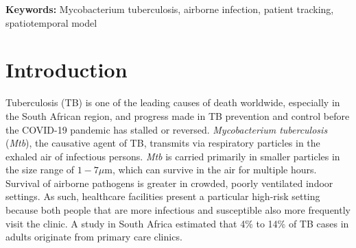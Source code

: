 \documentclass[fleqn,11pt]{wlscirep}
\begin{document}

\flushbottom
\maketitle
\setcounter{page}{1}
\thispagestyle{fancy}

\vspace{2em}


\vspace{0.5em}

\noindent\textbf{Keywords:} Mycobacterium tuberculosis, airborne infection, patient tracking, spatiotemporal model
\newpage

\sloppy
\raggedbottom

\newpage

\section{Introduction} 

Tuberculosis (TB) is one of the leading causes of death worldwide, especially in the South African region, and progress made in TB prevention and control before the COVID-19 pandemic has stalled or reversed\cite{WHO2022TBReport}. \emph{Mycobacterium tuberculosis} (\emph{Mtb}), the causative agent of TB, transmits via respiratory particles in the exhaled air of infectious persons\cite{Rieder1999,Patterson2021Tuberculosis}. \emph{Mtb} is carried primarily in smaller particles in the size range of $1-7\mu$m\cite{Fennelly2020Lancet}, which can survive in the air for multiple hours\cite{Loudon1969AMRRD}. Survival of airborne pathogens is greater in crowded, poorly ventilated indoor settings\cite{Rieder1999,CPS2013Book,Nardell1991ARRD,Wang2021Science,Morawska2021}. As such, healthcare facilities present a particular high-risk setting because both people that are more infectious and susceptible also more frequently visit the clinic\cite{McCreesh2020IJTLD}. A study in South Africa estimated that 4\% to 14\% of TB cases in adults originate from primary care clinics\cite{McCreesh2022BMJGlobalHealth}.
\end{document}
